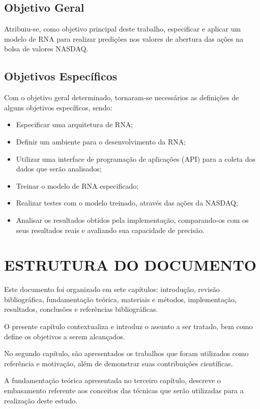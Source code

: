 \subsection{Objetivo Geral} 
Atribuiu-se, como objetivo principal deste trabalho, especificar e aplicar um modelo de RNA para realizar predições nos valores de abertura das ações na bolsa de valores NASDAQ.

\subsection{Objetivos Específicos}\label{subsec:objetivos_especificos}
Com o objetivo geral determinado, tornaram-se necessários as definições de alguns objetivos específicos, sendo:
\begin{itemize}
	\item Especificar uma arquitetura de RNA;
	\item Definir um ambiente para o desenvolvimento da RNA;
	\item Utilizar uma interface de programação de aplicações (API) para a coleta dos dados que serão analisados;
	\item Treinar o modelo de RNA especificado;
	\item Realizar testes com o modelo treinado, através das ações da NASDAQ;
	\item Analisar os resultados obtidos pela implementação, comparando-os com os seus resultados reais e avaliando sua capacidade de precisão.
\end{itemize}

\section{ESTRUTURA DO DOCUMENTO}\label{sec:organizacao-trabalho}
Este documento foi organizado em sete capítulos: introdução, revisão bibliográfica, fundamentação teórica, materiais e métodos, implementação, resultados, conclusões e referências bibliográficas.

O presente capítulo contextualiza e introduz o assunto a ser tratado, bem como define os objetivos a serem alcançados.

No segundo capítulo, são apresentados os trabalhos que foram utilizados como referência e motivação, além de demonstrar suas contribuições científicas.

A fundamentação teórica apresentada no terceiro capítulo, descreve o embasamento referente aos conceitos das técnicas que serão utilizadas para a realização deste estudo.

